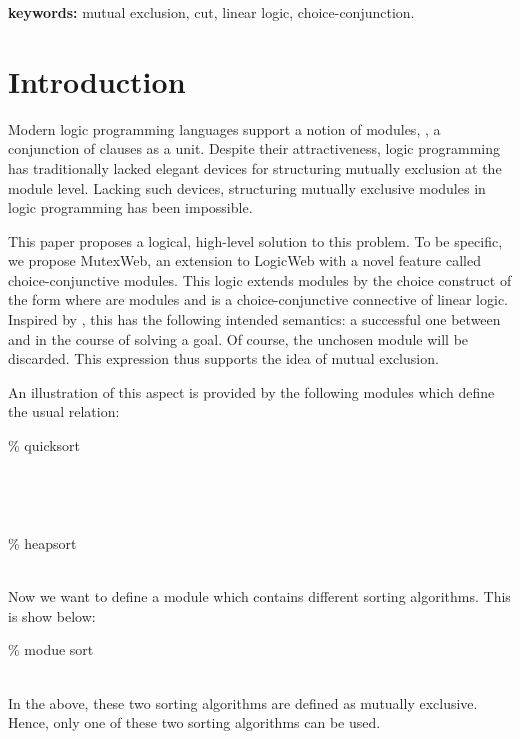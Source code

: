 \documentclass[12pt]{article}
\begin{document}
{\bf keywords:} mutual exclusion, cut, linear logic, choice-conjunction.


\maketitle


\newcommand{\muprolog}{LProlog}





\section{Introduction}\label{sec:intro}

Modern logic programming languages support a notion of modules, \ie,  a conjunction of clauses as a unit.
Despite their attractiveness, logic programming has 
traditionally lacked elegant devices for structuring mutually exclusion at the module level.
 Lacking such devices, structuring mutually exclusive modules in logic programming has  been impossible.


\newcommand{\hweb}{MutexWeb}

This paper proposes a logical, high-level solution to this problem. 
To be specific, we propose
\hweb, an extension to LogicWeb with a novel feature called choice-conjunctive modules.
 This logic extends  modules  by the choice construct 
 of the form  where  are modules and  is a choice-conjunctive connective of
linear logic.
Inspired by  \cite{Jap03}, this has the following intended semantics:  a successful one between  and  in the course of 
solving a goal. Of course, the unchosen module will be discarded.
This expression thus supports the idea of mutual exclusion. 

An illustration of this aspect is provided by the following modules  which define the 
usual
 relation:

\begin{exmple}
  \% quicksort \\ 
 \\
 \\ \\ \\
   \% heapsort  \\
 \\

\end{exmple}
\noindent 
Now we want to define a module  which contains different sorting algorithms.
This is show below:


\begin{exmple}
  \%  modue sort \\ 
 \\
\end{exmple}
\noindent In the above, these two sorting algorithms
 are defined as  mutually exclusive. Hence, only one of these two sorting algorithms
can be used. 
\end{document}
